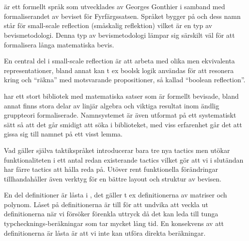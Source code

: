 \section{\ssr}
\ssr är ett formellt språk som utvecklades av Georges Gonthier i samband med
formaliserandet av beviset för Fyrfärgssatsen. Språket bygger på \coq och dess
namn står för small-scale reflection (småskalig reflektion) vilket är en typ av
bevismetodologi. Denna typ av bevismetodologi lämpar sig särskilt väl för att
formalisera långa matematiska bevis.

En central del i small-scale reflection är att arbeta med olika men ekvivalenta
representationer, bland annat kan t ex boolsk logik användas för att resonera
kring och ``räkna'' med motsvarande propositioner, så kallad ``boolean
reflection''.

\ssr har ett stort bibliotek med matematiska satser som är formellt bevisade,
bland annat finns stora delar av linjär algebra och viktiga resultat inom
ändlig gruppteori formaliserade. Namnsystemet är även utformat på ett
systematiskt sätt så att det går smidigt att söka i biblioteket, med viss
erfarenhet går det att gissa sig till namnet på ett visst lemma.

Vad gäller själva taktikspråket introducerar \ssr bara tre nya tactics men
utökar funktionaliteten i ett antal redan existerande tactics vilket gör att vi
i slutändan har färre tactics att hålla reda på. Utöver rent funktionella
förändringar tillhandahåller \ssr även verktyg för en bättre layout och
struktur av bevisen.

En del definitioner är låsta i \ssr, det gäller t ex definitionerna av matriser
och polynom. Låset på definitionerna är till för att undvika att veckla ut
definitionerna när vi försöker förenkla uttryck då det kan leda till tunga
typchecknings-beräkningar som tar mycket lång tid. En konsekvens av att
definitionerna är låsta är att vi inte kan utföra direkta beräkningar.

